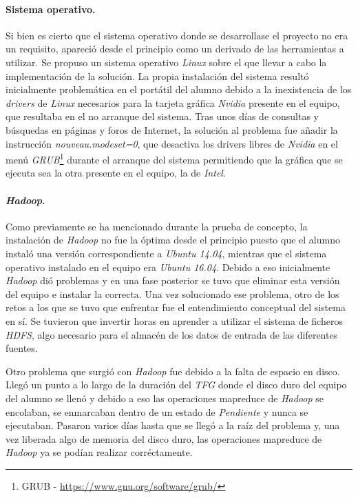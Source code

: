\paragraph*{Sistema operativo.} Si bien es cierto que el sistema operativo donde se desarrollase el proyecto no era un requisito, apareció desde el principio como un derivado de las herramientas a utilizar. Se propuso un sistema operativo \textit{Linux} \cite{wikilinux} sobre el que llevar a cabo la implementación de la solución. 
La propia instalación del sistema resultó inicialmente problemática en el portátil del alumno debido a la inexistencia de los \textit{drivers} de \textit{Linux} necesarios para la tarjeta gráfica \textit{Nvidia} \cite{wikinvidia} presente en el equipo, que resultaba en el no arranque del sistema. Tras unos días de consultas y búsquedas en páginas y foros de Internet, la solución al problema fue añadir la instrucción \textit{nouveau.modeset=0}, que desactiva los drivers libres de \textit{Nvidia} en el menú \textit{GRUB}\footnote{GRUB - \url{https://www.gnu.org/software/grub/}} durante el arranque del sistema permitiendo que la gráfica que se ejecuta sea la otra presente en el equipo, la de \textit{Intel}.

\paragraph*{\textit{Hadoop}.} Como previamente se ha mencionado durante la prueba de concepto, la instalación de \textit{Hadoop} no fue la óptima desde el principio puesto que el alumno instaló una versión correspondiente a \textit{Ubuntu 14.04}, mientras que el sistema operativo instalado en el equipo era \textit{Ubuntu 16.04}. Debido a eso inicialmente \textit{Hadoop} dió problemas y en una fase posterior se tuvo que eliminar esta versión del equipo e instalar la correcta. Una vez solucionado ese problema, otro de los retos a los que se tuvo que enfrentar fue el entendimiento conceptual del sistema en sí. Se tuvieron que invertir horas en aprender a utilizar el sistema de ficheros \textit{HDFS}, algo necesario para el almacén de los datos de entrada de las diferentes fuentes. 
\par
Otro problema que surgió con \textit{Hadoop} fue debido a la falta de espacio en disco. Llegó un punto a lo largo de la duración del \textit{TFG} donde el disco duro del equipo del alumno se llenó y debido a eso las operaciones \gls{mapreduce} de \textit{Hadoop} se encolaban, se enmarcaban dentro de un estado de \textit{Pendiente} y nunca se ejecutaban. Pasaron varios días hasta que se llegó a la raíz del problema y, una vez liberada algo de memoria del disco duro, las operaciones \gls{mapreduce} de \textit{Hadoop} ya se podían realizar corréctamente. 

